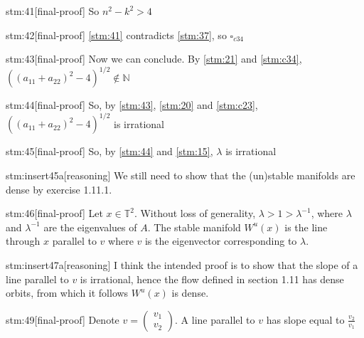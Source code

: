 \begin{stm}{stm:41}[final-proof]
So $n^2 - k^2 > 4$
\end{stm}

\begin{stm}{stm:42}[final-proof]
\ref{stm:41} contradicts \ref{stm:37}, so $\square_{c34}$
\end{stm}

\begin{stm}{stm:43}[final-proof]
Now we can conclude. By \ref{stm:21} and \ref{stm:c34}, $((a_{11} + a_{22})^2 - 4)^{1/2} \notin \mathbb{N}$
\end{stm}

\begin{stm}{stm:44}[final-proof]
So, by \ref{stm:43}, \ref{stm:20} and \ref{stm:c23}, $((a_{11} + a_{22})^2 - 4)^{1/2}$ is irrational
\end{stm}

\begin{stm}{stm:45}[final-proof]
So, by \ref{stm:44} and \ref{stm:15}, $\lambda$ is irrational
\end{stm}

\begin{stm}{stm:insert45a}[reasoning]
We still need to show that the (un)stable manifolds are dense by exercise 1.11.1.
\end{stm}

\begin{stm}{stm:46}[final-proof]
Let $x \in \mathbb{T}^2$. Without loss of generality, $\lambda > 1 > \lambda^{-1}$, where $\lambda$ and $\lambda^{-1}$ are the eigenvalues of $A$. The stable manifold $W^u(x)$ is the line through $x$ parallel to $v$ where $v$ is the eigenvector corresponding to $\lambda$.
\end{stm}

\begin{stm}{stm:insert47a}[reasoning]
I think the intended proof is to show that the slope of a line parallel to $v$ is irrational, hence the flow defined in section 1.11 has dense orbits, from which it follows $W^u(x)$ is dense.
\end{stm}

\begin{stm}{stm:49}[final-proof]
Denote $v = \begin{pmatrix} v_1 \\ v_2 \end{pmatrix}$. A line parallel to $v$ has slope equal to $\frac{v_2}{v_1}$
\end{stm}

